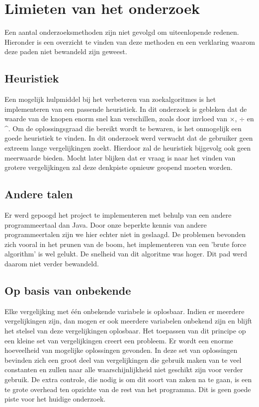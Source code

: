 \documentclass[Main.tex]{subfiles}
\begin{document}
\section{Limieten van het onderzoek}
Een aantal onderzoeksmethoden zijn niet gevolgd om uiteenlopende redenen. Hieronder is een overzicht te vinden van deze methoden en een verklaring waarom deze paden niet bewandeld zijn geweest. 

\subsection{Heuristiek}
Een mogelijk hulpmiddel bij het verbeteren van zoekalgoritmes is het implementeren van een passende heuristiek. In dit onderzoek is gebleken dat de waarde van de knopen enorm snel kan verschillen, zoals door invloed van $\times$, $\div$ en \^{}. Om de oplossingsgraad die bereikt wordt te bewaren, is het onmogelijk een goede heuristiek te vinden. In dit onderzoek werd verwacht dat de gebruiker geen extreem lange vergelijkingen zoekt. Hierdoor zal de heuristiek bijgevolg ook geen meerwaarde bieden. Mocht later blijken dat er vraag is naar het vinden van grotere vergelijkingen zal deze denkpiste opnieuw geopend moeten worden.

\subsection{Andere talen}
Er werd gepoogd het project te implementeren met behulp van een andere programmeertaal dan Java. Door onze beperkte kennis van andere programmeertalen zijn we hier echter niet in geslaagd. De problemen bevonden zich vooral in het prunen van de boom, het implementeren van een 'brute force algorithm' is wel gelukt. De snelheid van dit algoritme was hoger. Dit pad werd daarom niet verder bewandeld.

\subsection{Op basis van onbekende}
Elke vergelijking met \'e\'en onbekende variabele is oplosbaar. Indien er meerdere vergelijkingen zijn, dan mogen er ook meerdere variabelen onbekend zijn en blijft het stelsel van deze vergelijkingen oplosbaar. Het toepassen van dit principe op een kleine set van vergelijkingen creert een probleem. Er wordt een enorme hoeveelheid van mogelijke oplossingen gevonden. In deze set van oplossingen bevinden zich een groot deel van vergelijkingen die gebruik maken van te veel constanten en zullen naar alle waarschijnlijkheid niet geschikt zijn voor verder gebruik. De extra controle, die nodig is om dit soort van zaken na te gaan, is een te grote overhead ten opzichte van de rest van het programma. Dit is geen goede piste voor het huidige onderzoek.
\end{document}
